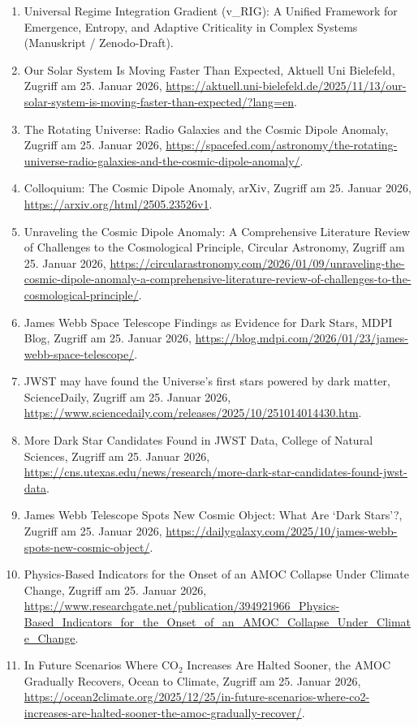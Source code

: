 \documentclass[11pt,a4paper]{article}
\begin{document}
\begin{enumerate}
\item Universal Regime Integration Gradient (v\_RIG): A Unified Framework for Emergence, Entropy, and Adaptive Criticality in Complex Systems (Manuskript / Zenodo-Draft).
\item Our Solar System Is Moving Faster Than Expected, Aktuell Uni Bielefeld, Zugriff am 25. Januar 2026, \url{https://aktuell.uni-bielefeld.de/2025/11/13/our-solar-system-is-moving-faster-than-expected/?lang=en}.
\item The Rotating Universe: Radio Galaxies and the Cosmic Dipole Anomaly, Zugriff am 25. Januar 2026, \url{https://spacefed.com/astronomy/the-rotating-universe-radio-galaxies-and-the-cosmic-dipole-anomaly/}.
\item Colloquium: The Cosmic Dipole Anomaly, arXiv, Zugriff am 25. Januar 2026, \url{https://arxiv.org/html/2505.23526v1}.
\item Unraveling the Cosmic Dipole Anomaly: A Comprehensive Literature Review of Challenges to the Cosmological Principle, Circular Astronomy, Zugriff am 25. Januar 2026, \url{https://circularastronomy.com/2026/01/09/unraveling-the-cosmic-dipole-anomaly-a-comprehensive-literature-review-of-challenges-to-the-cosmological-principle/}.
\item James Webb Space Telescope Findings as Evidence for Dark Stars, MDPI Blog, Zugriff am 25. Januar 2026, \url{https://blog.mdpi.com/2026/01/23/james-webb-space-telescope/}.
\item JWST may have found the Universe's first stars powered by dark matter, ScienceDaily, Zugriff am 25. Januar 2026, \url{https://www.sciencedaily.com/releases/2025/10/251014014430.htm}.
\item More Dark Star Candidates Found in JWST Data, College of Natural Sciences, Zugriff am 25. Januar 2026, \url{https://cns.utexas.edu/news/research/more-dark-star-candidates-found-jwst-data}.
\item James Webb Telescope Spots New Cosmic Object: What Are `Dark Stars'?, Zugriff am 25. Januar 2026, \url{https://dailygalaxy.com/2025/10/james-webb-spots-new-cosmic-object/}.
\item Physics-Based Indicators for the Onset of an AMOC Collapse Under Climate Change, Zugriff am 25. Januar 2026, \url{https://www.researchgate.net/publication/394921966_Physics-Based_Indicators_for_the_Onset_of_an_AMOC_Collapse_Under_Climate_Change}.
\item In Future Scenarios Where CO$_2$ Increases Are Halted Sooner, the AMOC Gradually Recovers, Ocean to Climate, Zugriff am 25. Januar 2026, \url{https://ocean2climate.org/2025/12/25/in-future-scenarios-where-co2-increases-are-halted-sooner-the-amoc-gradually-recover/}.

\end{enumerate}
\end{document}
